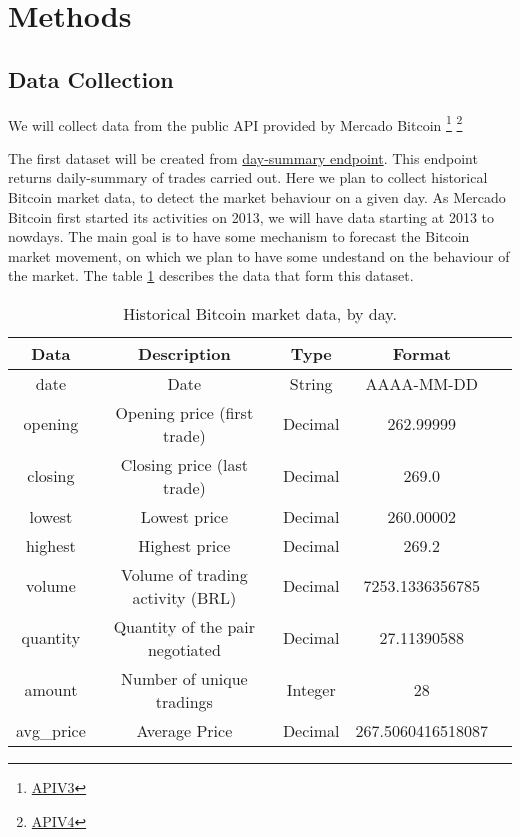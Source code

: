 \section{Methods}
\subsection{Data Collection}
\label{data:data_collection}
We will collect data from the public API provided by Mercado Bitcoin \footnote{\href{https://www.mercadobitcoin.com.br/api-doc/\#method_trade_api_daysummary}{APIV3}} \footnote{\href{https://api.mercadobitcoin.net/api/v4/docs\#tag/Public-Data/paths/\~1candles/get}{APIV4}}

The first dataset will be created from \href{https://www.mercadobitcoin.com.br/api-doc/\#method_trade_api_daysummary}{day-summary endpoint}. This endpoint returns daily-summary of trades carried out.
Here we plan to collect historical Bitcoin market data, to detect the market behaviour on a given day. As Mercado Bitcoin first started its activities on 2013, we will have data starting at 2013 to nowdays. The main goal is to have some mechanism to forecast the Bitcoin market movement, on which we plan to have some undestand on the behaviour of the market. The table \ref{dataset1} describes the data that form this dataset.

\begin{table}[ht]
    \centering
    \caption{Historical Bitcoin market data, by day.}
    \label{dataset1}
    \setlength{\tabcolsep}{2pt}
    \small
    \begin{tabular}{|c | c | c | c | c|}
    \hline
    \multicolumn{1}{|p{2cm}}{\centering Data} &
    \multicolumn{1}{|p{4.8cm}}{\centering Description} &
    \multicolumn{1}{|p{2cm}}{\centering Type} & 
    \multicolumn{1}{|p{4.8cm}|}{\centering Format} \\ \hline
    \multirow{1}{*}{\centering date} & \centering Date & String& AAAA-MM-DD\\ \hline
    \multirow{1}{*}{\centering opening} & \centering Opening price (first trade) & Decimal& 262.99999\\ \hline
    \multirow{1}{*}{\centering closing}& \centering Closing price (last trade) & Decimal & 269.0\\ \hline
    \multirow{1}{*}{\centering lowest}& \centering Lowest price & Decimal & 260.00002\\ \hline
    \multirow{1}{*}{\centering highest}& \centering Highest price & Decimal & 269.2\\ \hline
    \multirow{1}{*}{\centering volume}& \centering Volume of trading activity (BRL) & Decimal & 7253.1336356785\\ \hline
    \multirow{1}{*}{\centering quantity}& \centering Quantity of the pair negotiated & Decimal & 27.11390588\\ \hline
    \multirow{1}{*}{\centering amount}& \centering Number of unique tradings & Integer & 28\\ \hline
    \multirow{1}{*}{\centering avg\_price}& \centering Average Price & Decimal & 267.5060416518087\\ \hline
    \end{tabular}
\end{table}

